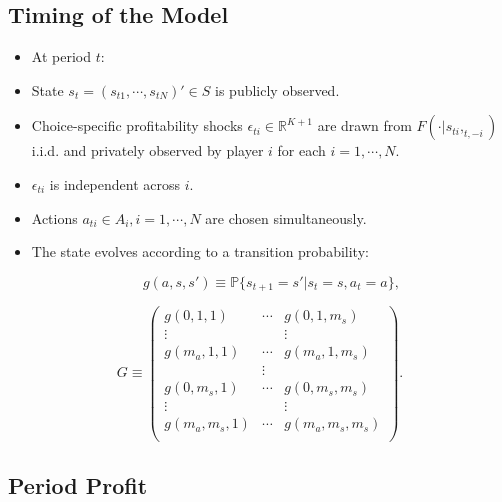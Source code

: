\documentclass[]{book}
\providecommand{\tightlist}{%
  \setlength{\itemsep}{0pt}\setlength{\parskip}{0pt}}
\begin{document}
\subsection{Timing of the Model}\label{timing-of-the-model-1}

\begin{itemize}
\tightlist
\item
  At period \(t\):
\item
  State \(s_t = (s_{t1}, \cdots, s_{tN})' \in S\) is publicly observed.
\item
  Choice-specific profitability shocks
  \(\epsilon_{ti} \in \mathbb{R}^{K + 1}\) are drawn from
  \(F(\cdot|s_{ti}, _{t,-i})\) i.i.d. and privately observed by player
  \(i\) for each \(i = 1, \cdots, N\).
\item
  \(\epsilon_{ti}\) is independent across \(i\).
\item
  Actions \(a_{ti} \in A_i, i = 1, \cdots, N\) are chosen
  simultaneously.
\item
  The state evolves according to a transition probability:

  \begin{equation}
  g(a, s, s') \equiv \mathbb{P}\{s_{t + 1} = s'|s_t = s, a_t = a\},
  \end{equation}
\end{itemize}

\begin{equation}
G \equiv 
\begin{pmatrix}
g(0, 1, 1) & \cdots & g(0, 1, m_s)\\
\vdots & & \vdots \\
g(m_a, 1, 1) & \cdots & g(m_a, 1, m_s)\\
&\vdots& \\
g(0, m_s, 1) & \cdots & g(0, m_s, m_s)\\
\vdots & & \vdots \\
g(m_a, m_s, 1) & \cdots & g(m_a, m_s, m_s)\\
\end{pmatrix}.
\end{equation}

\subsection{Period Profit}\label{period-profit}
\end{document}
